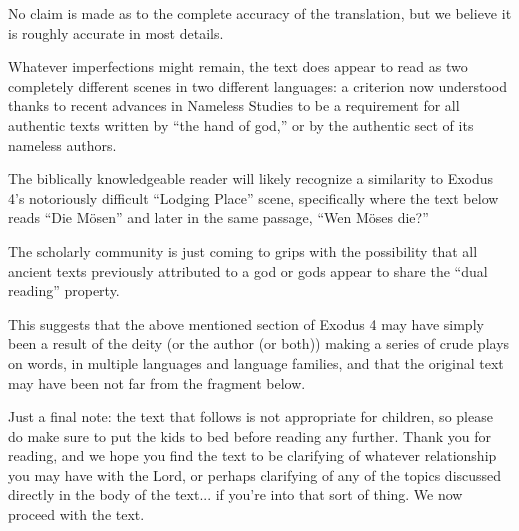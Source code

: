 {{No claim is made as to the complete accuracy of the translation, but we believe it is roughly accurate in most details.

Whatever imperfections might remain, the text does appear to read as two completely different scenes in two different languages: a criterion now understood \mdash{} thanks to recent advances in Nameless Studies \mdash{} to be a requirement for all authentic texts written by ``the hand of god,'' or by the authentic sect of its nameless authors.

The biblically knowledgeable reader will likely recognize a similarity to Exodus 4's notoriously difficult ``Lodging Place'' scene, specifically where the text below reads ``Die Mösen'' and later in the same passage, ``Wen Möses die?''

The scholarly community is just coming to grips with the possibility that all ancient texts previously attributed to a god or gods appear to share the ``dual reading'' property.

This suggests that the above mentioned section of Exodus 4 may have simply been a result of the deity (or the author (or both)) making a series of crude plays on words, in multiple languages and language families, and that the original text may have been not far from the fragment below.

Just a final note: the text that follows is not appropriate for children, so please do make sure to put the kids to bed before reading any further. Thank you for reading, and we hope you find the text to be clarifying of whatever relationship you may have with the Lord, or perhaps clarifying of any of the topics discussed directly in the body of the text... if you're into that sort of thing. We now proceed with the text.

}}
